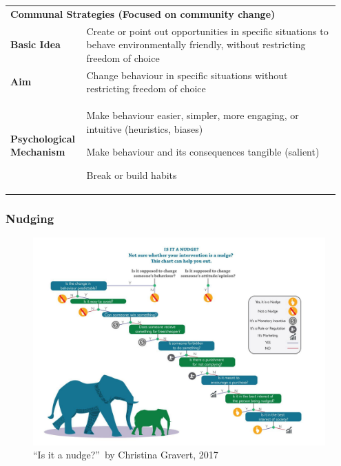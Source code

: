 \documentclass[11pt]{article}
\theoremstyle{definition}
\begin{document}
\begin{tabularx}{\linewidth}{p{0.2\linewidth} p{0.75\linewidth}}
	\multicolumn{2}{l}{\cellcolor{SteelBlue1!75} \textbf{Communal Strategies (Focused on community change)}}\\
	\textbf{Basic Idea} & Create or point out opportunities in specific situations to behave environmentally friendly, without restricting freedom of choice \\
	\textbf{Aim} & Change behaviour in specific situations without restricting freedom of choice \\
	\textbf{Psychological Mechanism} & \begin{itemize}[
		left=0pt,
		nosep,
		before={\begin{minipage}[t]{\hsize}},
			after={\end{minipage}}
		]
		\item Make behaviour easier, simpler, more engaging, or intuitive (heuristics, biases)
		\item Make behaviour and its consequences tangible (salient)
		\item Break or build habits
	\end{itemize}
\end{tabularx}

\subsubsection{Nudging}
\begin{figure}[H]
	\centering
	\includegraphics[width=0.9\linewidth]{img/nudging}
	\caption{\textquotedblleft Is it a nudge?\textquotedblright\ by Christina Gravert, 2017}
	\label{fig:nudging}
\end{figure}
\end{document}
